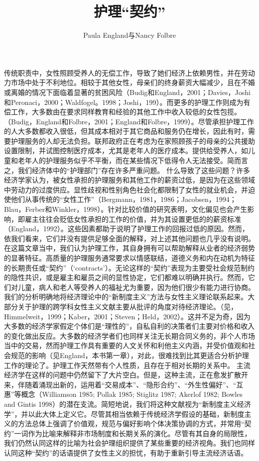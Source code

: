 \documentclass[UTF8]{ctexart}
\title{护理“契约”}
\author{Paula England与Nancy Folbre}
\begin{document}
\maketitle

传统职责中，女性照顾受养人的无偿工作，导致了她们经济上依赖男性，并在劳动力市场中处于不利地位。相较于其他女性，母亲们的终身薪资大幅减少，且在不婚或离婚的情况下面临着显著的贫困风险（Budig和Engl\newline and，2001；Davies，Joshi和Peronaci，2000；Waldfogel。1998；Joshi，199）。而更多的护理工作则成为有偿工作，大多数由在要求同样教育和经验的其他工作中收入较低的女性包揽。（Budig，England和Folbre，2001；England和Folbre，1999）。尽管承担护理工作的人大多数都收入很低，但其成本相对于其它商品和服务仍在增长，因此有时，需要护理服务的人却无法负担。联邦政府正在考虑为在家照顾孩子的母亲的公共援助设置限制，并试图控制医疗成本，尤其是老年人的医疗成本。提供给受养人，如儿童和老年人的护理服务似乎不平衡，而在某些情况下低得令人无法接受。简而言之，我们经济体中的“护理部门”存在许多严重问题。
什么导致了这些问题？许多经济学家认为，被女性承担的护理服务和其他工作的薪资过低，是因为在这些领域中劳动力的过度供应。显性歧视和性别角色社会化都限制了女性的就业机会，并迫使他们从事传统的“女性工作”（Bergmann，1981，1986；Jacobsen，1994；Blau，Ferber和Winkler，1998）。针对比较价值的研究表明，文化偏见也会产生影响，即雇主往往会贬低女性承担的工作的价值，并为其设置更低的的薪资标准（England，1992）。这些因素都助于说明了护理工作的回报过低的原因。然而，依我们看来，它们并没有提供足够全面的解释，对上述其他问题也几乎没有说明。
在这篇文章当中，我们认为护理工作，其自身拥有可以帮助解释从业者的经济弱势的显著特征。高质量的护理服务通常要求以情感联结，道德义务和内在动机为特征的长期责任或“契约”（‘contracts’）。无论这样的“契约”表现为主要受社会规范制约的隐性共识，或是雇主和雇员之间的显性协定，它们都难以明确并执行。然而，它们对儿童，病人和老人等受养人的福祉尤为重要，因为他们很少有能力进行协商。
我们的分析明确地将经济理论中的“新制度主义”方法与女性主义理论联系起来。大部分关于护理的跨学科女性主义文献主要从批评的角度对待经济理论。（见，Himmelweit，1999；Kaber，2001；Steven；Held，2002）。这并不足为奇，因为大多数的经济学家假定个体们是“理性的”，自私自利的决策者们主要对价格和收入的变化做出反应。大多数的经济学者们也同样关注无长期合同义务的，非个人市场当中的交易，然而护理工作具有重要的人文关怀和利他主义内涵，并受价值观和社会规范的影响（见England，本书第一章），对此，很难找到比其更适合分析护理工作的理论了。护理工作天然带有个人性质，且存在于相对长期的关系中。
主流经济学在这样的问题中仍然留下了大片空白。但是，这种主流，正在愈发扩散开来，伴随着涌现出新的，运用着“交易成本”、“隐形合约”、“外生性偏好”、“互惠”等概念（Williamson 1985; Pollak 1985; Stiglitz 1987; Akerlof 1982; Bowles and Gintis 1998）的潜在支流。简短地说，我们将这种文献视为“新制度主义经济学”，并以此大体上定义它。尽管其相当依赖于传统经济学假设的基础，新制度主义的方法总体上强调了价值观，规范与偏好影响个体决策协调的方式，并常用“契约”一词作为比喻来解释非市场制度和长期关系的演化。尽管有其自身的局限性，我们仍然认同这样的比喻为社会护理组织提供了某些重要的经济视角。我们也同样认同这种“契约”的话语提供了女性主义的担忧，有助于重新引导主流经济话语。
\end{document}

